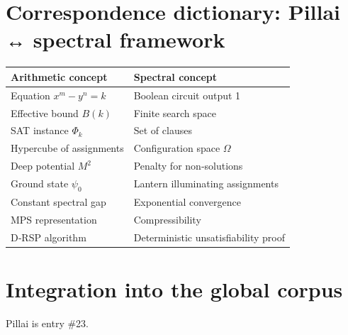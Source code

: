 \documentclass[11pt,a4paper]{article}
\begin{document}
\section{Correspondence dictionary: Pillai ↔ spectral framework}

\begin{center}
\small
\begin{tabular}{@{}l|l@{}}
\toprule
\textbf{Arithmetic concept} & \textbf{Spectral concept} \\
\midrule
Equation $x^m - y^n = k$ & Boolean circuit output 1 \\
Effective bound $B(k)$ & Finite search space \\
SAT instance $\Phi_k$ & Set of clauses \\
Hypercube of assignments & Configuration space $\Omega$ \\
Deep potential $M^2$ & Penalty for non‑solutions \\
Ground state $\psi_0$ & Lantern illuminating assignments \\
Constant spectral gap & Exponential convergence \\
MPS representation & Compressibility \\
D‑RSP algorithm & Deterministic unsatisfiability proof \\
\bottomrule
\end{tabular}
\end{center}

\section{Integration into the global corpus}

Pillai is entry \#23.
\end{document}
